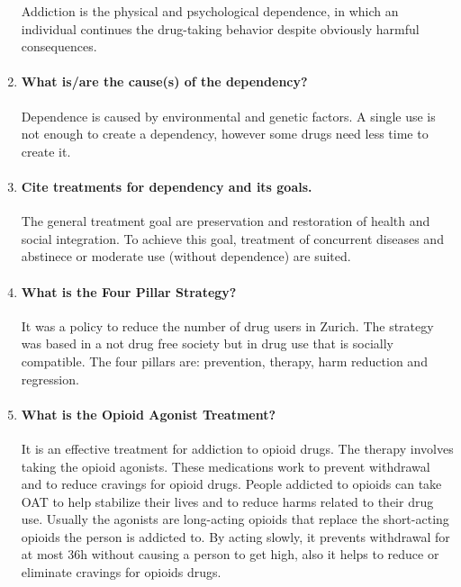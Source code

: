 \documentclass[12pt,article,oneside,a4paper]{memoir}
\begin{document}
\begin{enumerate}
Addiction is the physical and psychological dependence, in which an individual continues the drug-taking behavior despite obviously harmful consequences.

\item \paragraph{What is/are the cause(s) of the dependency?}
Dependence is caused by environmental and genetic factors. A single use is not
enough to create a dependency, however some drugs need less time to create it.

\item \paragraph{Cite treatments for dependency and its goals.}
The general treatment goal are preservation and restoration of health and
social integration. To achieve this goal, treatment of concurrent diseases and
abstinece or moderate use (without dependence) are suited.

\item \paragraph{What is the Four Pillar Strategy?}
It was a policy to reduce the number of drug users in Zurich. The strategy was
based in a not drug free society but in drug use that is socially compatible.
The four pillars are: prevention, therapy, harm reduction and regression.

\item \paragraph{What is the Opioid Agonist Treatment?}
It is an effective treatment for addiction to opioid drugs. The therapy
involves taking the opioid agonists. These medications work to prevent
withdrawal and to reduce cravings for opioid drugs. People addicted to opioids
can take OAT to help stabilize their lives and to reduce harms related to their
drug use. Usually the agonists are long-acting opioids that replace the
short-acting opioids the person is addicted to. By acting slowly, it prevents
withdrawal for at most 36h without causing a person to get high, also it helps
to reduce or eliminate cravings for opioids drugs.


\end{enumerate}
\end{document}
